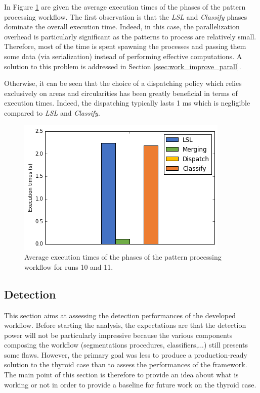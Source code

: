 In Figure \ref{fig:perf_pattern_processing} are given the average execution times of the phases of the pattern processing workflow. The first observation is that the \textit{LSL} and \textit{Classify} phases dominate the overall execution time. Indeed, in this case, the parallelization overhead is particularly significant as the patterns to process are relatively small. Therefore, most of the time is spent spawning the processes and passing them some data (via serialization) instead of performing effective computations. A solution to this problem is addressed in Section \ref{ssec:work_improve_parall}. 

Otherwise, it can be seen that the choice of a dispatching policy which relies exclusively on areas and circularities has been greatly beneficial in terms of execution times. Indeed, the dispatching typically lasts 1 ms which is negligible compared to \textit{LSL} and \textit{Classify}.

\begin{figure}
	\center
	\includegraphics[scale=0.5]{image/perf_pattern_process.png}
	\caption{Average execution times of the phases of the pattern processing workflow for runs 10 and 11.}
	\label{fig:perf_pattern_processing}
\end{figure}

\subsection{Detection}

This section aims at assessing the detection performances of the developed workflow. Before starting the analysis, the expectations are that the detection power will not be particularly impressive because the various components composing the workflow (segmentations procedures, classifiers,...) still presents some flaws. However, the primary goal was less to produce a production-ready solution to the thyroid case than to assess the performances of the framework. The main point of this section is therefore to provide an idea about what is working or not in order to provide a baseline for future work on the thyroid case. 

